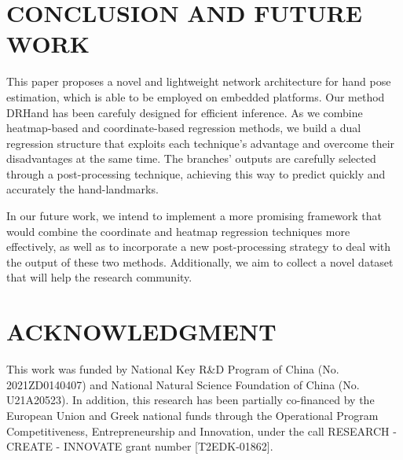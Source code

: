 \documentclass[11pt]{article}
\begin{document}
\section{CONCLUSION AND FUTURE WORK}
This paper proposes a novel and lightweight network architecture for hand pose estimation, which is able to be employed on embedded platforms. Our method DRHand has been carefuly designed for efficient inference. As we combine heatmap-based and coordinate-based regression methods, we build a dual regression structure that exploits each technique’s advantage and overcome their disadvantages at the same time. The branches’ outputs are carefully selected through a post-processing technique, achieving this way to predict quickly and accurately the hand-landmarks.

In our future work, we intend to implement a more promising framework that would combine the coordinate and heatmap regression techniques more effectively, as well as to incorporate a new post-processing strategy to deal with the output of these two methods. Additionally, we aim to collect a novel dataset that will help the research community.

\section*{ACKNOWLEDGMENT}
This work was funded by National Key R\&D Program of China (No. 2021ZD0140407) and National Natural Science Foundation of China (No. U21A20523). In addition, this research has been partially co-financed by the European Union and Greek national funds through the Operational Program Competitiveness, Entrepreneurship and Innovation, under the call RESEARCH - CREATE - INNOVATE grant number [T2EDK-01862].
\end{document}
